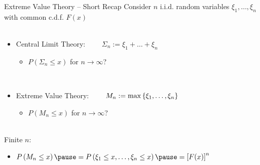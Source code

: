 \begin{frame}{Extreme Value Theory -- Short Recap}
    Consider $n$ i.i.d. random variables $\xi_1, \dots, \xi_n$ with common c.d.f. $F(x)$\,\\ \,\\
    \begin{itemize}
        \pause\item[\bpt] Central Limit Theory: $\qquad \Sigma_n := \xi_1 + \dots + \xi_n$
        \begin{itemize}
            \pause\item[ ] $P(\Sigma_n \le x)$ for $n\rightarrow\infty$?
        \end{itemize}
        \,\\
        \pause\item[\bpt] Extreme Value Theory: $\qquad M_n := \max\left\{ \xi_1, \dots, \xi_n \right\}$
        \begin{itemize}
            \pause\item[ ] $P(M_n \le x)$ for $n\rightarrow\infty$?
        \end{itemize}
    \end{itemize}
    \,\\
    {\pause}Finite $n$:
    \begin{itemize}
        \item[] $P\kla\left( M_n \le x \right) \pause = P\kla\left( \xi_1 \le x, \dots, \xi_n \le x \right) \pause = \left[ F(x) \right]^n$
    \end{itemize}
\end{frame}


